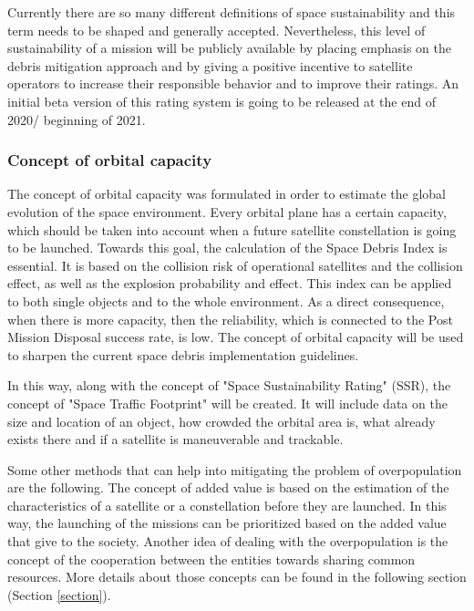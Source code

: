 Currently there are so many different definitions of space sustainability and this term needs to be shaped and generally accepted. Nevertheless, this level of sustainability of a mission will be publicly available by placing emphasis on the debris mitigation approach and by giving a positive incentive to satellite operators to increase their responsible behavior and to improve their ratings. An initial beta version of this rating system is going to be released at the end of 2020/ beginning of 2021. \cite{Space sustainability}

\bigskip
\subsubsection{Concept of orbital capacity}
\bigskip

The concept of orbital capacity was formulated in order to estimate the global evolution of the space environment. Every orbital plane has a certain capacity, which should be taken into account when a future satellite constellation is going to be launched. Towards this goal, the calculation of the Space Debris Index is essential. It is based on the collision risk of operational satellites and the collision effect, as well as the explosion probability and effect. This index can be applied to both single objects and to the whole environment. As a direct consequence, when there is more capacity, then the reliability, which is connected to the Post Mission Disposal success rate, is low. The concept of orbital capacity will be used to sharpen the current space debris implementation guidelines. \cite{Letizia 2019}

In this way, along with the concept of "Space Sustainability Rating" (SSR), the concept of "Space Traffic Footprint" will be created. It will include data on the size and location of an object, how crowded the orbital area is, what already exists there and if a satellite is maneuverable and trackable. \cite{Space sustainability}

\bigskip
Some other methods that can help into mitigating the problem of overpopulation are the following. The concept of added value is based on the estimation of the characteristics of a satellite or a constellation before they are launched. In this way, the launching of the missions can be prioritized based on the added value that give to the society. Another idea of dealing with the overpopulation is the concept of the cooperation between the entities towards sharing common resources. More details about those concepts can be found in the following section (Section \ref{section}).


